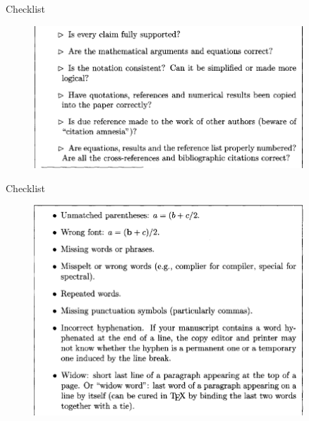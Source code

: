 \documentclass[UTF8]{ctexbeamer}
\begin{document}
\begin{frame}{Checklist}
    \begin{figure}
        \centering
        \includegraphics[width=0.9\textwidth]{figure/Figure 7_1_2.png}
        \label{fig:my_label}
    \end{figure}
\end{frame}

\begin{frame}{Checklist}
    \begin{figure}
        \centering
        \includegraphics[width=0.9\textwidth]{figure/Figure 8.2.1.png}
        \label{fig:my_label}
    \end{figure}
\end{frame}
\end{document}
